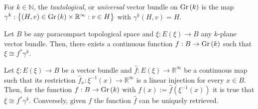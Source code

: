 \begin{definition} For $k\in\mathbb{N}$, the \emph{tautological}, or \emph{universal} vector bundle on $\Gr{k}$ is the map $\gamma^k:\big\{(H,v)\in\Gr{k}\times\mathbb{R}^{\infty}:v\in H\big\}$ with $\gamma^k(H,v)=H$.
\end{definition}

\begin{theorem}\label{thm:universal} Let $B$ be any paracompact topological space and $\xi:E(\xi)\to B$ any $k$-plane vector bundle. Then, there exists a continuous function $f:B\to\Gr{k}$ such that $\xi\cong f^*\gamma^k$.
\end{theorem}

\begin{lemma}\label{lem:injection_from_total_space} Let $\xi:E(\xi)\to B$ be a vector bundle and $\hat{f}:E(\xi)\to\mathbb{R}^{\infty}$ be a continuous map such that its restriction $\hat{f}_x:\xi^{-1}(x)\to\mathbb{R}^{\infty}$ is a linear injection for every $x\in B$. Then, for the function $f:B\to\Gr{k}$ with $f(x):=\hat{f}(\xi^{-1}(x))$ it is true that $\xi\cong f^*\gamma^k$. Conversely, given $f$ the function $\hat{f}$ can be uniquely retrieved.
\end{lemma}

